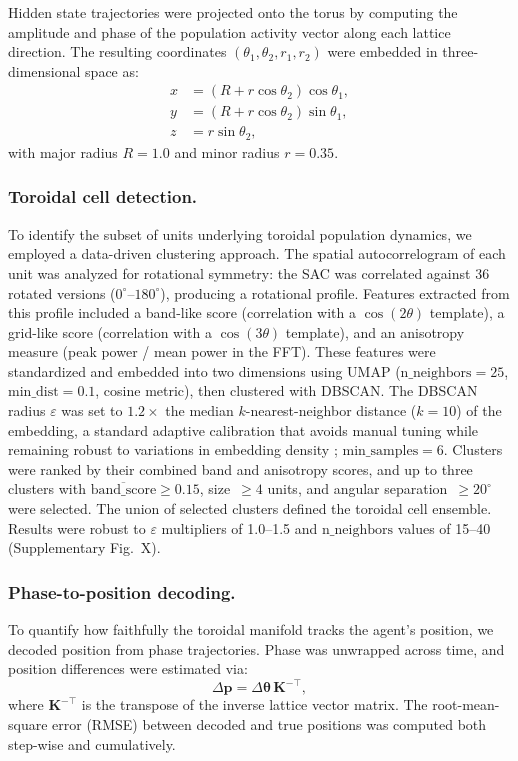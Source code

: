 \documentclass[11pt]{article}
\begin{document}
Hidden state trajectories were projected onto the torus by computing the amplitude and phase of the population activity vector along each lattice direction. The resulting coordinates $(\theta_1, \theta_2, r_1, r_2)$ were embedded in three-dimensional space as:
\begin{align}
    x &= (R + r\cos\theta_2)\cos\theta_1, \nonumber\\
    y &= (R + r\cos\theta_2)\sin\theta_1, \\
    z &= r\sin\theta_2, \nonumber
\end{align}
with major radius $R = 1.0$ and minor radius $r = 0.35$.

\subsubsection*{Toroidal cell detection.}
To identify the subset of units underlying toroidal population dynamics, we employed a data-driven clustering approach. The spatial autocorrelogram of each unit was analyzed for rotational symmetry: the SAC was correlated against 36 rotated versions ($0^\circ$--$180^\circ$), producing a rotational profile. Features extracted from this profile included a band-like score (correlation with a $\cos(2\theta)$ template), a grid-like score (correlation with a $\cos(3\theta)$ template), and an anisotropy measure (peak power / mean power in the FFT). These features were standardized and embedded into two dimensions using UMAP \cite{mcinnes2018} ($\mathrm{n\_neighbors} = 25$, $\mathrm{min\_dist} = 0.1$, cosine metric), then clustered with DBSCAN. The DBSCAN radius $\varepsilon$ was set to $1.2\times$ the median $k$-nearest-neighbor distance ($k = 10$) of the embedding, a standard adaptive calibration that avoids manual tuning while remaining robust to variations in embedding density \cite{ester1996}; $\mathrm{min\_samples} = 6$. Clusters were ranked by their combined band and anisotropy scores, and up to three clusters with $\overline{\mathrm{band\_score}} \ge 0.15$, size~$\ge 4$ units, and angular separation~$\ge 20^\circ$ were selected. The union of selected clusters defined the toroidal cell ensemble. Results were robust to $\varepsilon$ multipliers of 1.0--1.5 and $\mathrm{n\_neighbors}$ values of 15--40 (Supplementary Fig.~X).

\subsubsection*{Phase-to-position decoding.}
To quantify how faithfully the toroidal manifold tracks the agent's position, we decoded position from phase trajectories. Phase was unwrapped across time, and position differences were estimated via:
\begin{equation}
    \Delta\mathbf{p} = \Delta\boldsymbol{\theta}\,\mathbf{K}^{-\top},
\end{equation}
where $\mathbf{K}^{-\top}$ is the transpose of the inverse lattice vector matrix. The root-mean-square error (RMSE) between decoded and true positions was computed both step-wise and cumulatively.
\end{document}
